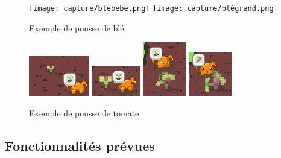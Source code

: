 \documentclass{article}
\begin{document}
\begin{figure}[h]
    \centering
    \texttt{[image: capture/blébebe.png]}
    \texttt{[image: capture/blégrand.png]} 
    \caption{Exemple de pousse de blé}
\end{figure}
\begin{figure}[h]
    \centering
    \includegraphics{capture/tomateGraine.png}
    \includegraphics{capture/TomateMoyen.png}
    \includegraphics{capture/toamteAdulte.png}
    \includegraphics{capture/tomateFini.png}
    \caption{Exemple de pousse de tomate}
    \label{fig:enter-label}
\end{figure}






\subsection{Fonctionnalités prévues}
\end{document}
